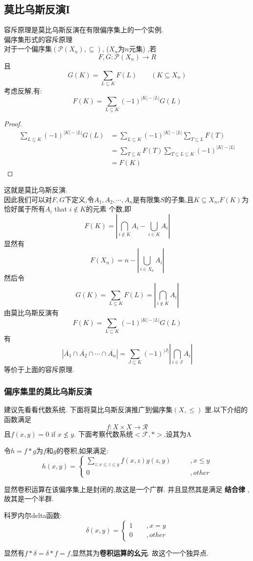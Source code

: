 \subsection{莫比乌斯反演I}
容斥原理是莫比乌斯反演在有限偏序集上的一个实例.\\
偏序集形式的容斥原理\\
对于一个偏序集$ (\mathcal{P}(X_n),\subseteq) $, ($X_n$为$n$元集) ,若
$$
F,G:\mathcal{P}(X_n)\rightarrow R
$$
且
$$
G(K)=\sum_{L\subseteq K} F(L)\qquad (K\subseteq X_n)
$$
考虑反解,有:
$$
F(K)=\sum_{L\subseteq K} (-1)^{|K|-|L|}G(L)
$$
\begin{proof}
$$
\begin{aligned}
\sum_{L\subseteq K} (-1)^{|K|-|L|} G(L)&= \sum_{L\subseteq K} (-1)^{|K|-|L|} \sum_{T\subseteq L} F(T)\\
&= \sum_{T\subseteq K} F(T) \sum_{T\subseteq L\subseteq K} (-1)^{|K|-|L|}\\
&=F(K)
\end{aligned}
$$
\end{proof}
这就是莫比乌斯反演.\\
因此我们可以对$F,G$下定义,令$A_1,A_2,\cdots,A_n$是有限集$S$的子集,且$K\subseteq X_n$,$F(K)$为恰好属于所有$A_i$ that $i\notin K$的元素
个数,即
$$
F(K)=\left| \bigcap_{i\notin K} A_i -\bigcup_{i \in K} A_i \right|
$$
显然有
$$
F(X_n)=n-\left| \bigcup_{i \in X_n} A_i  \right|
$$
然后令
$$
G(K) =\sum_{L\subseteq K} F(L)=\left| \bigcap_{i \notin K} A_i \right|
$$
由莫比乌斯反演有
$$
F(K)=\sum_{L\subseteq K} (-1)^{|K|-|L|}G(L)
$$
有
$$
|\overline{A_1}\cap \overline{A_2} \cap \cdots \cap \overline{A_n}|=\sum_{J\subseteq K} (-1)^{|J|} \left|\bigcap_{i\in J}A_i \right|
$$
等价于上面的容斥原理.

\subsubsection{偏序集里的莫比乌斯反演}
建议先看看代数系统.
下面将莫比乌斯反演推广到偏序集$(X,\le)$ 里.以下介绍的函数满足
$$
f:X \times X \rightarrow \mathcal{R}
$$
且$f(x,y)=0$ if $x\nleq y$.
下面考察代数系统$<\mathcal{F},*>$,设其为A
\begin{definition}
令$h=f*g$为$f$和$g$的卷积,如果满足:
$$
h(x,y)=\begin{cases} \sum_{z:x\leq z\leq y} f(x,z)g(z,y) \qquad&,x\leq y\\ 0\qquad &,other\end{cases}
$$
\end{definition}
显然卷积运算在该偏序集上是封闭的,故这是一个广群.
并且显然其是满足 \textbf{结合律} ,故其是一个半群.
\begin{definition}
科罗内尔delta函数:
$$
\delta(x,y)=\begin{cases}1\qquad ,x=y\\ 0\qquad,other\end{cases}
$$
\end{definition}
显然有$f*\delta=\delta*f=f$,显然其为\textbf{卷积运算的幺元}.
故这个一个独异点.

